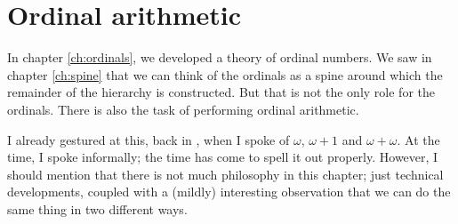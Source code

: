 \documentclass[../../../include/open-logic-chapter]{subfiles}
\begin{document}
\chapter{Ordinal arithmetic}\label{ch:ord-arithmetic}
In chapter \ref{ch:ordinals}, we developed a theory of ordinal numbers. We saw in chapter \ref{ch:spine} that we can think of the ordinals as a spine around which the remainder of the hierarchy is constructed. But that is not the only role for the ordinals. There is also the task of performing ordinal arithmetic. 

I already gestured at this, back in , when I spoke of $\omega$, $\omega+1$ and $\omega+\omega$. At the time, I spoke informally; the time has come to spell it out properly. However, I should mention that there is not much philosophy in this chapter; just technical developments, coupled with a (mildly) interesting observation that we can do the same thing in two different ways.


\OLEndChapterHook
\end{document}
